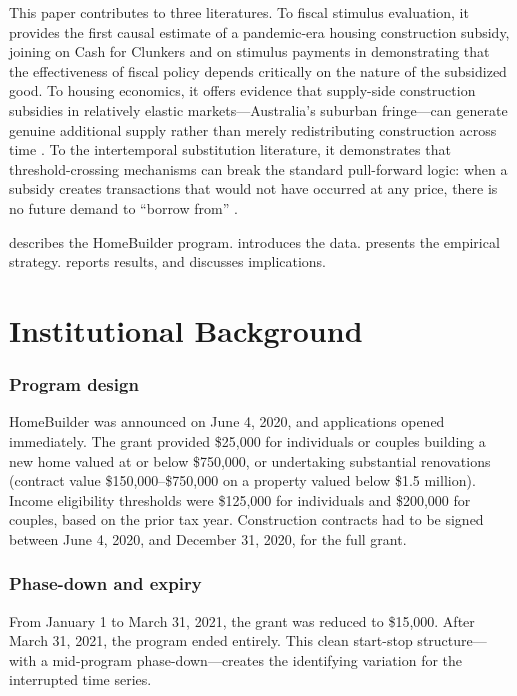 \documentclass[12pt]{article}
\begin{document}
This paper contributes to three literatures. To fiscal stimulus evaluation, it provides the first causal estimate of a pandemic-era housing construction subsidy, joining \citet{mian2012} on Cash for Clunkers and \citet{parker2013} on stimulus payments in demonstrating that the effectiveness of fiscal policy depends critically on the nature of the subsidized good. To housing economics, it offers evidence that supply-side construction subsidies in relatively elastic markets---Australia's suburban fringe---can generate genuine additional supply rather than merely redistributing construction across time \citep{saiz2010, caldera2013}. To the intertemporal substitution literature, it demonstrates that threshold-crossing mechanisms can break the standard pull-forward logic: when a subsidy creates transactions that would not have occurred at any price, there is no future demand to ``borrow from'' \citep{best2020}.

 describes the HomeBuilder program.  introduces the data.  presents the empirical strategy.  reports results, and  discusses implications.

\section{Institutional Background}
\label{sec:background}

\subsubsection*{Program design} HomeBuilder was announced on June 4, 2020, and applications opened immediately. The grant provided \$25,000 for individuals or couples building a new home valued at or below \$750,000, or undertaking substantial renovations (contract value \$150,000--\$750,000 on a property valued below \$1.5 million). Income eligibility thresholds were \$125,000 for individuals and \$200,000 for couples, based on the prior tax year. Construction contracts had to be signed between June 4, 2020, and December 31, 2020, for the full grant.

\subsubsection*{Phase-down and expiry} From January 1 to March 31, 2021, the grant was reduced to \$15,000. After March 31, 2021, the program ended entirely. This clean start-stop structure---with a mid-program phase-down---creates the identifying variation for the interrupted time series.
\end{document}
